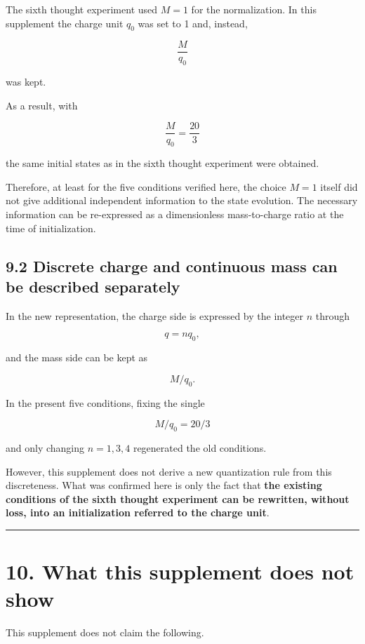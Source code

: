 \documentclass[
  a4paper,
]{article}
\begin{document}
The sixth thought experiment used \(M=1\) for the normalization. In this
supplement the charge unit \(q_0\) was set to 1 and, instead,

\[
\frac{M}{q_0}
\]

was kept.

As a result, with

\[
\frac{M}{q_0}=\frac{20}{3}
\]

the same initial states as in the sixth thought experiment were
obtained.

Therefore, at least for the five conditions verified here, the choice
\(M=1\) itself did not give additional independent information to the
state evolution. The necessary information can be re-expressed as a
dimensionless mass-to-charge ratio at the time of initialization.

\subsection{9.2 Discrete charge and continuous mass can be described
separately}\label{discrete-charge-and-continuous-mass-can-be-described-separately}

In the new representation, the charge side is expressed by the integer
\(n\) through

\[
q=nq_0,
\]

and the mass side can be kept as

\[
M/q_0.
\]

In the present five conditions, fixing the single

\[
M/q_0=20/3
\]

and only changing \(n=1,3,4\) regenerated the old conditions.

However, this supplement does not derive a new quantization rule from
this discreteness. What was confirmed here is only the fact that
\textbf{the existing conditions of the sixth thought experiment can be
rewritten, without loss, into an initialization referred to the charge
unit}.

\begin{center}\rule{0.5\linewidth}{0.5pt}\end{center}

\section{10. What this supplement does not
show}\label{what-this-supplement-does-not-show}

This supplement does not claim the following.
\end{document}
